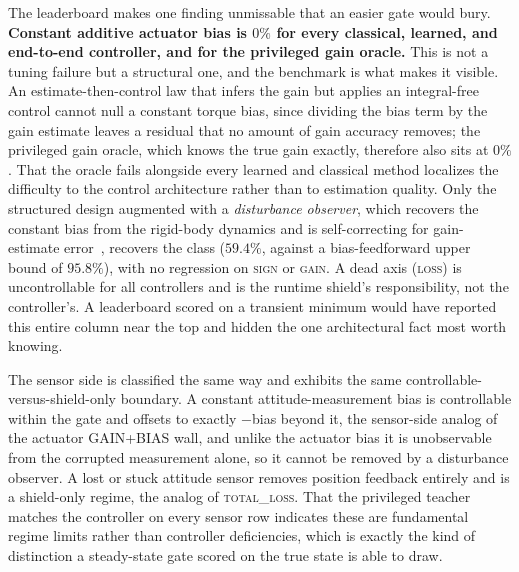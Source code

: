 \documentclass[11pt]{article}
\begin{document}


The leaderboard makes one finding unmissable that an easier gate would bury. \textbf{Constant
additive actuator bias is $0\%$ for every classical, learned, and end-to-end controller, and for the
privileged gain oracle.} This is not a tuning failure but a structural one, and the benchmark is what
makes it visible. An estimate-then-control law that infers the gain but applies an integral-free
control cannot null a constant torque bias, since dividing the bias term by the gain estimate leaves
a residual that no amount of gain accuracy removes; the privileged gain oracle, which knows the true
gain exactly, therefore also sits at $0\%$. That the oracle fails alongside every learned and
classical method localizes the difficulty to the control architecture rather than to estimation
quality. Only the structured design augmented with a \emph{disturbance observer}, which recovers the
constant bias from the rigid-body dynamics and is self-correcting for gain-estimate
error~\cite{Chen2016}, recovers the class ($59.4\%$, against a bias-feedforward upper bound of
$95.8\%$), with no regression on \textsc{sign} or \textsc{gain}. A dead axis (\textsc{loss}) is
uncontrollable for all controllers and is the runtime shield's responsibility, not the controller's.
A leaderboard scored on a transient minimum would have reported this entire column near the top and
hidden the one architectural fact most worth knowing.



The sensor side is classified the same way and exhibits the same controllable-versus-shield-only
boundary. A constant attitude-measurement bias is controllable within the gate and offsets to exactly
$-$bias beyond it, the sensor-side analog of the actuator GAIN+BIAS wall, and unlike the actuator bias
it is unobservable from the corrupted measurement alone, so it cannot be removed by a disturbance
observer. A lost or stuck attitude sensor removes position feedback entirely and is a shield-only
regime, the analog of \textsc{total\_loss}. That the privileged teacher matches the controller on
every sensor row indicates these are fundamental regime limits rather than controller deficiencies,
which is exactly the kind of distinction a steady-state gate scored on the true state is able to draw.
\end{document}
